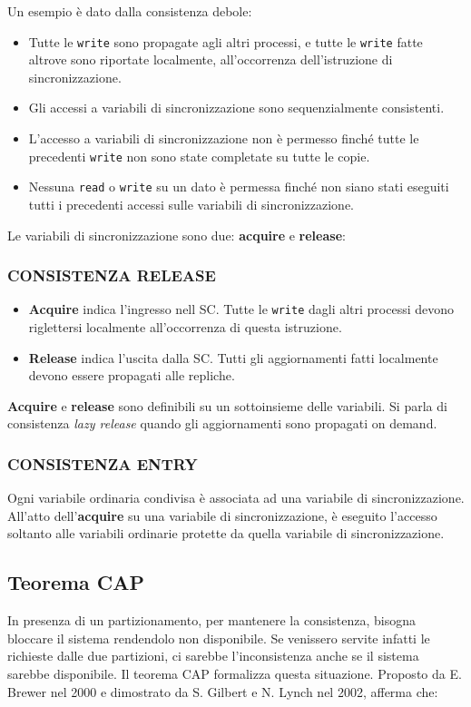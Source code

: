 Un esempio è dato dalla consistenza debole:
\begin{itemize}
    \item Tutte le \texttt{write} sono propagate agli altri processi, e tutte le \texttt{write} fatte altrove sono riportate localmente, all'occorrenza dell'istruzione di sincronizzazione.
    \item Gli accessi a variabili di sincronizzazione sono sequenzialmente consistenti.
    \item L'accesso a variabili di sincronizzazione non è permesso finché tutte le precedenti \texttt{write} non sono state completate su tutte le copie.
    \item Nessuna \texttt{read} o \texttt{write} su un dato è permessa finché non siano stati eseguiti tutti i precedenti accessi sulle variabili di sincronizzazione.
\end{itemize}
Le variabili di sincronizzazione sono due: \textbf{acquire} e \textbf{release}:
\subsubsection{CONSISTENZA RELEASE}
\begin{itemize}
    \item \textbf{Acquire} indica l'ingresso nell SC. Tutte le \texttt{write} dagli altri processi devono riglettersi localmente all'occorrenza di questa istruzione.
    \item \textbf{Release} indica l'uscita dalla SC. Tutti gli aggiornamenti fatti localmente devono essere propagati alle repliche.
\end{itemize}
\textbf{Acquire} e \textbf{release} sono definibili su un sottoinsieme delle variabili. Si parla di consistenza \textit{lazy release} quando gli aggiornamenti sono propagati on demand.

\subsubsection{CONSISTENZA ENTRY}
Ogni variabile ordinaria condivisa è associata ad una variabile di sincronizzazione. All'atto dell'\textbf{acquire} su una variabile di sincronizzazione, è eseguito l'accesso soltanto alle variabili ordinarie protette da quella variabile di sincronizzazione.

\subsection{Teorema CAP}
In presenza di un partizionamento, per mantenere la consistenza, bisogna bloccare il sistema rendendolo non disponibile. Se venissero servite infatti le richieste dalle due partizioni, ci sarebbe l'inconsistenza anche se il sistema sarebbe disponibile.
Il teorema CAP formalizza questa situazione. Proposto da E. Brewer nel 2000 e dimostrato da S. Gilbert e N. Lynch nel 2002, afferma che:

